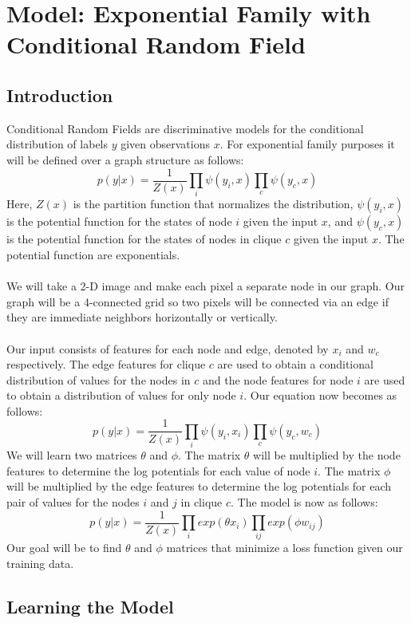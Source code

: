 \section{Model: Exponential Family with Conditional Random Field}

\subsection{Introduction}

Conditional Random Fields are discriminative models for the conditional distribution of labels $y$ given observations $x$. For exponential family purposes it will be defined over a graph structure as follows:
\[
p(y|x) = \frac{1}{Z(x)} \prod_i{\psi(y_i,x)} \prod_{c}{\psi(y_c,x)}
\]
Here, $Z(x)$ is the partition function that normalizes the distribution, $\psi(y_i,x)$ is the potential function for the states of node $i$ given the input $x$, and $\psi(y_c,x)$ is the potential function for the states of nodes in clique $c$ given the input $x$. The potential function are exponentials.\\
\\
We will take a 2-D image and make each pixel a separate node in our graph. Our graph will be a 4-connected grid so two pixels will be connected via an edge if they are immediate neighbors horizontally or vertically. \\
\\
Our input consists of features for each node and edge, denoted by $x_i$ and $w_c$ respectively. The edge features for clique $c$ are used to obtain a conditional distribution of values for the nodes in $c$ and the node features for node $i$ are used to obtain a distribution of values for only node $i$. Our equation now becomes as follows:
\[
p(y|x) = \frac{1}{Z(x)} \prod_i{\psi(y_i,x_i)} \prod_{c}{\psi(y_c,w_c)}
\]
We will learn two matrices $\theta$ and $\phi$. The matrix $\theta$ will be multiplied by the node features to determine the log potentials for each value of node $i$. The matrix $\phi$ will be multiplied by the edge features to determine the log potentials for each pair of values for the nodes $i$ and $j$ in clique $c$. The model is now as follows:
\[
p(y|x) = \frac{1}{Z(x)} \prod_i{exp(\theta x_i)} \prod_{ij}{exp(\phi w_{ij})}
\]
Our goal will be to find $\theta$ and $\phi$ matrices that minimize a loss function given our training data. 

\subsection{Learning the Model}

